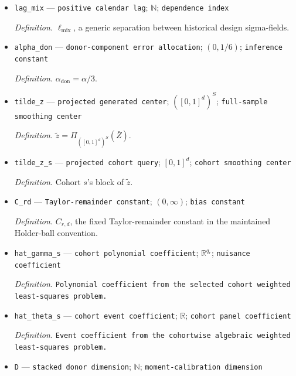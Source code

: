 \documentclass{article}
\begin{document}
\begin{itemize}
  \par\smallskip\noindent\emph{Definition.} \(e_0=b_r(0)\).
  \item \texttt{lag\_\allowbreak{}mix} --- \texttt{positive calendar lag}; \(\mathbb N\); \texttt{dependence index}
  \par\smallskip\noindent\emph{Definition.} \(\ell_{\mathrm{mix}}\), a generic separation between historical design sigma-fields.
  \item \texttt{alpha\_\allowbreak{}don} --- \texttt{donor-\allowbreak{}component error allocation}; \((0,1/6)\); \texttt{inference constant}
  \par\smallskip\noindent\emph{Definition.} \(\alpha_{\mathrm{don}}=\alpha/3\).
  \item \texttt{tilde\_\allowbreak{}z} --- \texttt{projected generated center}; \(([0,1]^d)^S\); \texttt{full-\allowbreak{}sample smoothing center}
  \par\smallskip\noindent\emph{Definition.} \(\widetilde z=\Pi_{([0,1]^d)^S}(\bar Z)\).
  \item \texttt{tilde\_\allowbreak{}z\_\allowbreak{}s} --- \texttt{projected cohort query}; \([0,1]^d\); \texttt{cohort smoothing center}
  \par\smallskip\noindent\emph{Definition.} Cohort \(s\)'s block of \(\widetilde z\).
  \item \texttt{C\_\allowbreak{}rd} --- \texttt{Taylor-\allowbreak{}remainder constant}; \((0,\infty)\); \texttt{bias constant}
  \par\smallskip\noindent\emph{Definition.} \(C_{r,d}\), the fixed Taylor-remainder constant in the maintained Holder-ball convention.
  \item \texttt{hat\_\allowbreak{}gamma\_\allowbreak{}s} --- \texttt{cohort polynomial coefficient}; \(\mathbb R^{q_r}\); \texttt{nuisance coefficient}
  \par\smallskip\noindent\emph{Definition.} \texttt{Polynomial coefficient from the selected cohort weighted least-\allowbreak{}squares problem.}
  \item \texttt{hat\_\allowbreak{}theta\_\allowbreak{}s} --- \texttt{cohort event coefficient}; \(\mathbb R\); \texttt{cohort panel coefficient}
  \par\smallskip\noindent\emph{Definition.} \texttt{Event coefficient from the cohortwise algebraic weighted least-\allowbreak{}squares problem.}
  \item \texttt{D} --- \texttt{stacked donor dimension}; \(\mathbb N\); \texttt{moment-\allowbreak{}calibration dimension}

\end{itemize}
\end{document}
